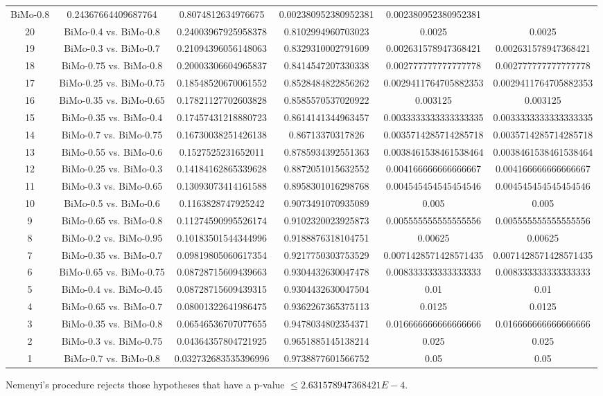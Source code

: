 \documentclass[a4paper,10pt]{article}
\begin{document}
\begin{landscape}
\begin{table}[!htp]
\begin{tabular}{cccccc}
BiMo-0.8&0.24367664409687764&0.8074812634976675&0.002380952380952381&0.002380952380952381\\20&BiMo-0.4 vs. BiMo-0.8&0.24003967925958378&0.8102994960703023&0.0025&0.0025\\19&BiMo-0.3 vs. BiMo-0.7&0.21094396056148063&0.8329310002791609&0.002631578947368421&0.002631578947368421\\18&BiMo-0.75 vs. BiMo-0.8&0.20003306604965837&0.8414547207330338&0.002777777777777778&0.002777777777777778\\17&BiMo-0.25 vs. BiMo-0.75&0.18548520670061552&0.8528484822856262&0.0029411764705882353&0.0029411764705882353\\16&BiMo-0.35 vs. BiMo-0.65&0.17821127702603828&0.8585570537020922&0.003125&0.003125\\15&BiMo-0.35 vs. BiMo-0.4&0.17457431218880723&0.8614141344963457&0.0033333333333333335&0.0033333333333333335\\14&BiMo-0.7 vs. BiMo-0.75&0.16730038251426138&0.86713370317826&0.0035714285714285718&0.0035714285714285718\\13&BiMo-0.55 vs. BiMo-0.6&0.1527525231652011&0.8785934392551363&0.0038461538461538464&0.0038461538461538464\\12&BiMo-0.25 vs. BiMo-0.3&0.14184162865339628&0.8872051015632552&0.004166666666666667&0.004166666666666667\\11&BiMo-0.3 vs. BiMo-0.65&0.13093073414161588&0.8958301016298768&0.004545454545454546&0.004545454545454546\\10&BiMo-0.5 vs. BiMo-0.6&0.1163828747925242&0.9073491070935089&0.005&0.005\\9&BiMo-0.65 vs. BiMo-0.8&0.11274590995526174&0.9102320023925873&0.005555555555555556&0.005555555555555556\\8&BiMo-0.2 vs. BiMo-0.95&0.10183501544344996&0.9188876318104751&0.00625&0.00625\\7&BiMo-0.35 vs. BiMo-0.7&0.09819805060617354&0.9217750303753529&0.0071428571428571435&0.0071428571428571435\\6&BiMo-0.65 vs. BiMo-0.75&0.08728715609439663&0.9304432630047478&0.008333333333333333&0.008333333333333333\\5&BiMo-0.4 vs. BiMo-0.45&0.08728715609439315&0.9304432630047504&0.01&0.01\\4&BiMo-0.65 vs. BiMo-0.7&0.08001322641986475&0.9362267365375113&0.0125&0.0125\\3&BiMo-0.35 vs. BiMo-0.8&0.06546536707077655&0.9478034802354371&0.016666666666666666&0.016666666666666666\\2&BiMo-0.3 vs. BiMo-0.75&0.04364357804721925&0.9651885145138214&0.025&0.025\\1&BiMo-0.7 vs. BiMo-0.8&0.032732683535396996&0.9738877601566752&0.05&0.05\\\hline
\end{tabular}
\end{table}
Nemenyi's procedure rejects those hypotheses that have a p-value $\le2.631578947368421E-4$.



\end{landscape}
\end{document}
